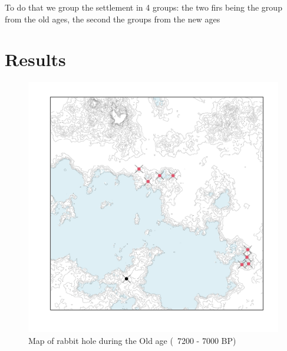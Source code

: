 \documentclass[10pt]{paper}
\begin{document}
To do that we group the settlement in 4 groups: the two firs being the group from the old ages, the second the groups from the new ages 


\pagebreak

\section{Results}

\begin{figure}
    \centering
    \includegraphics[width=.65\textwidth]{oldages}
    \caption{Map of rabbit hole during the Old age (~7200 - 7000 BP)  }
    \label{fig:newage}
\end{figure}
\end{document}
